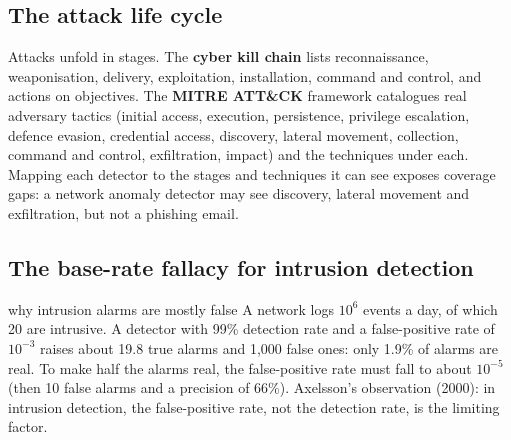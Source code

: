 \documentclass[11pt]{article}
\begin{document}
\subsection{The attack life cycle}
Attacks unfold in stages. The \textbf{cyber kill chain} lists reconnaissance, weaponisation, delivery, exploitation, installation, command and control, and actions on objectives. The \textbf{MITRE ATT\&CK} framework catalogues real adversary tactics (initial access, execution, persistence, privilege escalation, defence evasion, credential access, discovery, lateral movement, collection, command and control, exfiltration, impact) and the techniques under each. Mapping each detector to the stages and techniques it can see exposes coverage gaps: a network anomaly detector may see discovery, lateral movement and exfiltration, but not a phishing email.
\subsection{The base-rate fallacy for intrusion detection}
\begin{example}{why intrusion alarms are mostly false}
A network logs $10^6$ events a day, of which 20 are intrusive. A detector with 99\% detection rate and a false-positive rate of $10^{-3}$ raises about 19.8 true alarms and 1,000 false ones: only 1.9\% of alarms are real. To make half the alarms real, the false-positive rate must fall to about $10^{-5}$ (then 10 false alarms and a precision of 66\%). Axelsson's observation (2000): in intrusion detection, the false-positive rate, not the detection rate, is the limiting factor.
\end{example}
\end{document}
